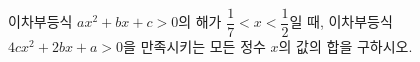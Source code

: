 이차부등식 $ax^2+bx+c>0$의 해가 $\dfrac{1}{7}<x<\dfrac{1}{2}$일 때, 이차부등식 $4cx^2+2bx+a>0$을 만족시키는 모든 정수 $x$의 값의 합을 구하시오. 
